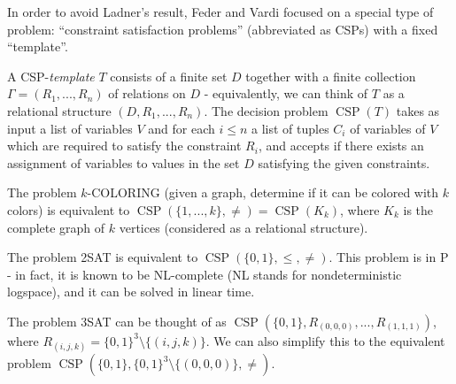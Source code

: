 \documentclass[letterpaper,11pt]{article}
\DeclareMathOperator{\CSP}{CSP}
\begin{document}
In order to avoid Ladner's result, Feder and Vardi focused on a special type of problem: ``constraint satisfaction problems'' (abbreviated as CSPs) with a fixed ``template''.%

\begin{defn} A CSP-\emph{template} $T$ consists of a finite set $D$ together with a finite collection $\Gamma = (R_1, ..., R_n)$ of relations on $D$ - equivalently, we can think of $T$ as a relational structure $(D, R_1, ..., R_n)$. The decision problem $\CSP(T)$ takes as input a list of variables $V$ and for each $i \le n$ a list of tuples $C_i$ of variables of $V$ which are required to satisfy the constraint $R_i$, and accepts if there exists an assignment of variables to values in the set $D$ satisfying the given constraints.%
\end{defn}

\begin{comment}
\begin{thm}[Feder, Vardi \cite{feder-vardi}] Every problem in MMSNP is equivalent under randomized polynomial time reductions to a CSP, and vice versa.
\end{thm}

Having justified restricting our studies to CSPs, we now give some examples of particularly famous CSP templates.
\end{comment}

\begin{ex} The problem $k$-COLORING (given a graph, determine if it can be colored with $k$ colors) is equivalent to $\CSP(\{1, ..., k\}, \ne) = \CSP(K_k)$, where $K_k$ is the complete graph of $k$ vertices (considered as a relational structure).
\end{ex}

\begin{ex} The problem 2SAT is equivalent to $\CSP(\{0,1\}, \le, \ne)$. This problem is in P - in fact, it is known to be NL-complete (NL stands for nondeterministic logspace), and it can be solved in linear time.
\end{ex}

\begin{ex} The problem 3SAT can be thought of as $\CSP(\{0,1\}, R_{(0,0,0)}, ..., R_{(1,1,1)})$, where $R_{(i,j,k)} = \{0,1\}^3 \setminus \{(i,j,k)\}$. We can also simplify this to the equivalent problem $\CSP(\{0,1\}, \{0,1\}^3\setminus\{(0,0,0)\}, \ne)$.
\end{ex}
\end{document}
